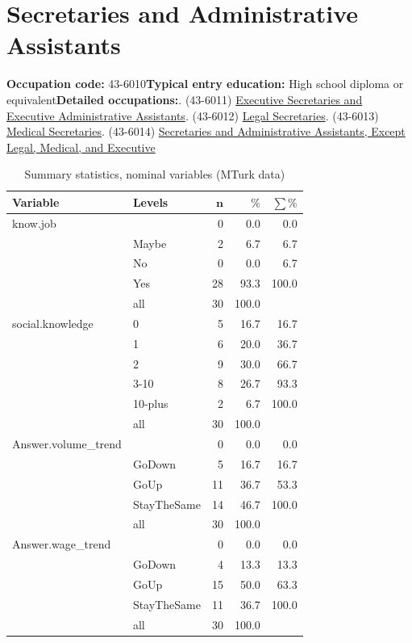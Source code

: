 \documentclass[a4paper,10pt]{article}\usepackage[]{graphicx}\usepackage[]{color}
\begin{document}
\newpage\section{Secretaries and Administrative Assistants}\textbf{Occupation code:} 43-6010\newline\textbf{Typical entry education:} High school diploma or equivalent\newline\textbf{Detailed occupations:}. (43-6011)  \href{http://www.bls.gov/oes/current/oes436011.htm}{Executive Secretaries and Executive Administrative Assistants}. (43-6012)  \href{http://www.bls.gov/oes/current/oes436012.htm}{Legal Secretaries}. (43-6013)  \href{http://www.bls.gov/oes/current/oes436013.htm}{Medical Secretaries}. (43-6014)  \href{http://www.bls.gov/oes/current/oes436014.htm}{Secretaries and Administrative Assistants, Except Legal, Medical, and Executive}\newline%
\begin{table}[ht]
\centering
{\footnotesize
\begin{tabular}{ll|rrr}
 \textbf{Variable} & \textbf{Levels} & $\mathbf{n}$ & $\mathbf{\%}$ & $\mathbf{\sum \%}$ \\ 
  \hline
know.job &  & 0 & 0.0 & 0.0 \\ 
   & Maybe & 2 & 6.7 & 6.7 \\ 
   & No & 0 & 0.0 & 6.7 \\ 
   & Yes & 28 & 93.3 & 100.0 \\ 
   \hline
 & all & 30 & 100.0 &  \\ 
   \hline
\hline
social.knowledge & 0 & 5 & 16.7 & 16.7 \\ 
   & 1 & 6 & 20.0 & 36.7 \\ 
   & 2 & 9 & 30.0 & 66.7 \\ 
   & 3-10 & 8 & 26.7 & 93.3 \\ 
   & 10-plus & 2 & 6.7 & 100.0 \\ 
   \hline
 & all & 30 & 100.0 &  \\ 
   \hline
\hline
Answer.volume\_trend &  & 0 & 0.0 & 0.0 \\ 
   & GoDown & 5 & 16.7 & 16.7 \\ 
   & GoUp & 11 & 36.7 & 53.3 \\ 
   & StayTheSame & 14 & 46.7 & 100.0 \\ 
   \hline
 & all & 30 & 100.0 &  \\ 
   \hline
\hline
Answer.wage\_trend &  & 0 & 0.0 & 0.0 \\ 
   & GoDown & 4 & 13.3 & 13.3 \\ 
   & GoUp & 15 & 50.0 & 63.3 \\ 
   & StayTheSame & 11 & 36.7 & 100.0 \\ 
   \hline
 & all & 30 & 100.0 &  \\ 
   \hline
\hline
\end{tabular}
}
\caption{Summary statistics, nominal variables (MTurk data)} 
\label{tab1:43-6010}
\end{table}
\end{document}

